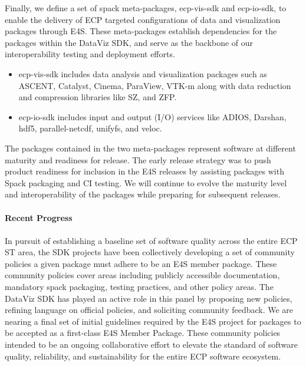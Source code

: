 Finally, we define a set of spack meta-packages, ecp-vis-sdk and ecp-io-sdk, to enable the delivery of ECP targeted configurations of data and visualization packages through E4S.  These meta-packages establish dependencies for the packages within the DataViz SDK, and serve as the backbone of our interoperability testing and deployment efforts. 

\begin{itemize}
\item ecp-vis-sdk includes data analysis and visualization packages such as ASCENT, Catalyst, Cinema, ParaView, VTK-m along with data reduction and compression libraries like SZ, and ZFP.
\item ecp-io-sdk includes input and output (I/O) services like ADIOS, Darshan, hdf5, parallel-netcdf, unifyfs, and veloc.
 \end{itemize}

\noindent
The packages contained in the two meta-packages represent software at different maturity and readiness for release. The early release strategy was to push product readiness for inclusion in the E4S releases by assisting packages with Spack packaging and CI testing. We will continue to evolve the maturity level and interoperability of the packages while preparing for subsequent releases.

\paragraph{\textbf{Recent Progress}}
\paragraph{}

In pursuit of establishing a baseline set of software quality across the entire ECP ST area, the SDK projects have been collectively developing a set of community policies a given package must adhere to be an E4S member package.  These community policies cover areas including publicly accessible documentation, mandatory spack packaging, testing practices, and other policy areas.  The DataViz SDK has played an active role in this panel by proposing new policies, refining language on official policies, and soliciting community feedback.  We are nearing a final set of initial guidelines required by the E4S project for packages to be accepted as a first-class E4S Member Package.  These community policies intended to be an ongoing collaborative effort to elevate the standard of software quality, reliability, and sustainability for the entire ECP software ecosystem.

